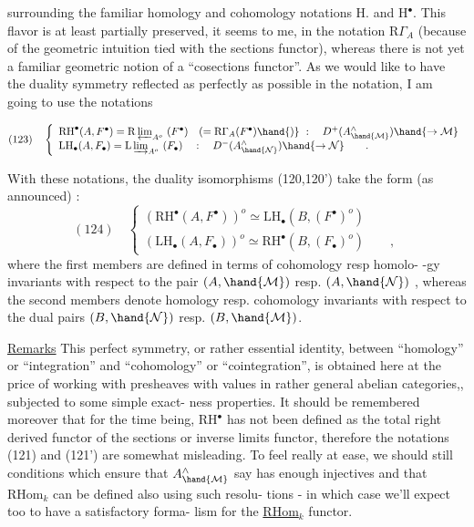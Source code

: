 
surrounding the familiar homology and cohomology notations H. and H$^{\bullet}$.
This flavor is at least partially preserved, it seems to me, in the
notation $\mathrm{R}\Gamma_{A}$ (because of the geometric intuition tied with the sections
functor), whereas there is not yet a familiar geometric notion of a
``cosections functor''. As we would like to have the duality symmetry
reflected as perfectly as possible in the notation, I am going to
use the notations

\[
(123)\quad \left\{ \begin{array}{l}
\mathrm{RH}^{\bullet}(A,F^{\bullet}) = \mathrm{R}\varprojlim_{A^{o}}\ (F^{\bullet}) \quad ( = \mathrm{R}\Gamma_{A}(F^{\bullet})\hand{)} \ : \quad D^{+}(A^{\wedge}_{\hand{\mathcal{M}}}) \hand{\to \mathcal{M}} \\
\mathrm{LH}_{\bullet}(A,F_{\bullet}) = \mathrm{L}\varinjlim_{A^{o}}\ (F_{\bullet}) \quad : \quad D^{-}(A^{\wedge}_{\hand{\mathcal{N}}}) \hand{\to \mathcal{N}} \qquad .
\end{array} \right.
\]

With these notations, the duality isomorphisms (120,120') take the
form (as announced) :
\[
(124)\quad \left\{ \begin{array}{l}
(\mathrm{RH}^{\bullet}(A,F^{\bullet}))^{o} \simeq \mathrm{LH}_{\bullet}(B,(F^{\bullet})^{o}) \\
(\mathrm{LH}_{\bullet}(A,F_{\bullet}))^{o} \simeq \mathrm{RH}^{\bullet}(B,(F_{\bullet})^{o}) \qquad ,
\end{array} \right.
\]
where the first members are defined in terms of cohomology resp homolo-%
-gy invariants with respect to the pair $(A,\hand{\mathcal{M}})$ resp. $(A,\hand{\mathcal{N}})$ , whereas
the second members denote homology resp. cohomology invariants with
respect to the dual pairs $(B,\hand{\mathcal{N}})$ resp. $(B,\hand{\mathcal{M}})$.

\uline{Remarks} This perfect symmetry, or rather essential identity, between
``homology'' or ``integration'' and ``cohomology'' or ``cointegration'', is
obtained here at the price of working with presheaves with values in
rather general abelian categories,, subjected to some simple exact-%
ness properties. It should be remembered moreover that for the time
being, RH$^{\bullet}$ has not been defined as the total right derived functor of
the sections or  inverse limits functor, therefore the notations
(121) and (121') are somewhat misleading. To feel really at ease, we
should  still  conditions which ensure that $A^{\wedge}_{\hand{\mathcal{M}}}$ say has
enough injectives and that RHom$_{k}$ can be defined also using such resolu-%
tions - in which case we'll expect too to have a satisfactory forma-%
lism for the \uline{RHom}$_{k}$ functor.

